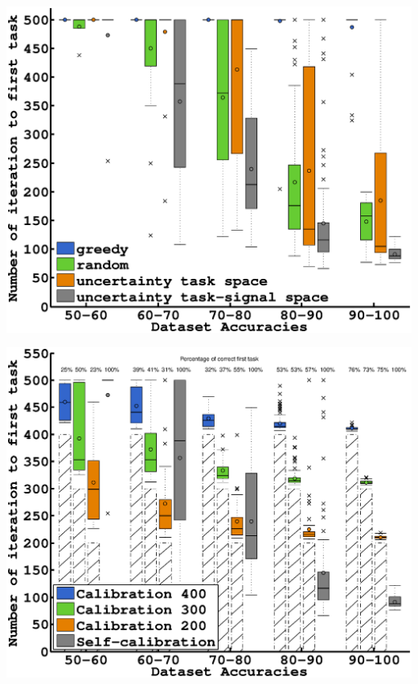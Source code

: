 \documentclass[a0,final, portrait]{inriaposter}
\begin{document}
\begin{multicols}{2}
{\begin{center}
\begin{minipage}{.46\columnwidth}
	\begin{center}
		\includegraphics[width=\columnwidth]{images/plot_EEG_planning}
	\end{center}
\end{minipage}
\begin{minipage}{.02\columnwidth}
	\begin{center}

	\end{center}
\end{minipage}
\begin{minipage}{.442\columnwidth}
	\begin{center}
		\includegraphics[width=\columnwidth]{images/plot_EEG_calib_firstconf}
	\end{center}
\end{minipage}
\end{center}

}
\end{multicols}
\end{document}
